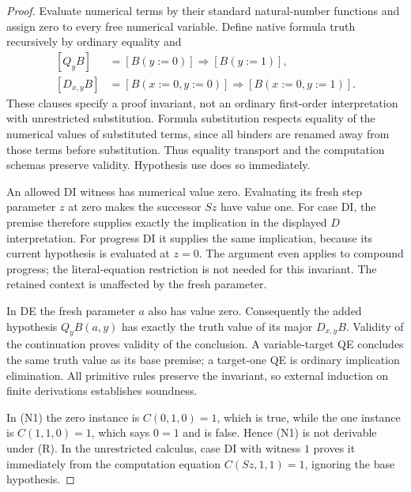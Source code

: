 \begin{proof}
Evaluate numerical terms by their standard natural-number functions and
assign zero to every free numerical variable. Define native formula truth
recursively by ordinary equality and
\[
\begin{split}
[Q_yB]&=[B(y:=0)]\Rightarrow[B(y:=1)],\\
[D_{x,y}B]&=[B(x:=0,y:=0)]\Rightarrow[B(x:=0,y:=1)].
\end{split}
\]
These clauses specify a proof invariant, not an ordinary first-order
interpretation with unrestricted substitution. Formula substitution
respects equality of the numerical values of substituted terms, since
all binders are renamed away from those terms before substitution.
Thus equality transport and the computation schemas preserve validity.
Hypothesis use does so immediately.

An allowed DI witness has numerical value zero. Evaluating its fresh
step parameter $z$ at zero makes the successor $Sz$ have value one.
For case DI, the premise therefore supplies exactly the implication in
the displayed $D$ interpretation. For progress DI it supplies the same
implication, because its current hypothesis is evaluated at $z=0$.
The argument even applies to compound progress; the literal-equation
restriction is not needed for this invariant. The retained context is
unaffected by the fresh parameter.

In DE the fresh parameter $a$ also has value zero. Consequently the added
hypothesis $Q_yB(a,y)$ has exactly the truth value of its major $D_{x,y}B$.
Validity of the continuation proves validity of the conclusion. A
variable-target QE concludes the same truth value as its base premise;
a target-one QE is ordinary implication elimination. All primitive rules
preserve the invariant, so external induction on finite derivations
establishes soundness.

In (N1) the zero instance is $C(0,1,0)=1$, which is true, while the one
instance is $C(1,1,0)=1$, which says $0=1$ and is false. Hence (N1) is not
derivable under (R). In the unrestricted calculus, case DI with witness
$1$ proves it immediately from the computation equation
$C(Sz,1,1)=1$, ignoring the base hypothesis.
\end{proof}

